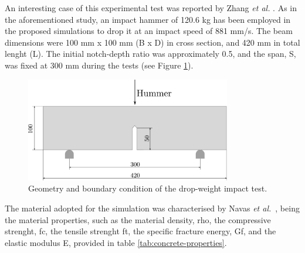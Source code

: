 \documentclass[preprint,12pt,a4paper]{elsarticle}
\begin{document}
An interesting case of this experimental test was reported by Zhang {\it et al.} \cite{Zhang_2009,Zhang_2010a}. As in the aforementioned study,
an impact hammer of 120.6 kg has been employed in the proposed simulations to drop it at an impact
speed of 881 mm/s. The beam dimensions were 100 mm x 100 mm (B x D)
in cross section, and 420 mm in total lenght (L). The initial
notch-depth ratio was approximately 0.5, and the span, S, was fixed at
300 mm during the tests (see Figure
\ref{fig:geometry-drop-weight-impact-test}).
\begin{figure}
  \centering
  \includegraphics[width=0.8\textwidth]{./Figure-impact-test}
  \caption{Geometry and boundary condition of the drop-weight impact test.}
  \label{fig:geometry-drop-weight-impact-test}
\end{figure}
The material adopted for the simulation was characterised by Navas
{\it et al.}~\cite{Navas_2017_ES}, being the material properties, such
as the material density, \gls{rho}, the compressive strenght, \gls{fc},
the tensile strenght \gls{ft}, the specific fracture energy, \gls{Gf},
and the elastic modulus \gls{E}, provided in table \ref{tab:concrete-properties}.\\
\end{document}
